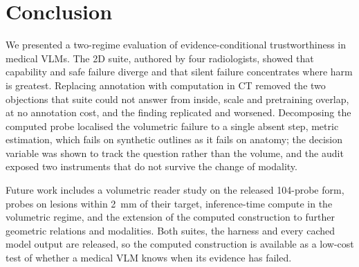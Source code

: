 \section{Conclusion}
\label{sec:conclusion}

We presented a two-regime evaluation of evidence-conditional trustworthiness
in medical VLMs. The 2D suite, authored by four radiologists, showed that
capability and safe failure diverge and that silent failure concentrates
where harm is greatest. Replacing annotation with computation in CT removed
the two objections that suite could not answer from inside, scale and
pretraining overlap, at no annotation cost, and the finding replicated and
worsened. Decomposing the computed probe localised the volumetric
failure to a single absent step, metric estimation, which fails on synthetic
outlines as it fails on anatomy; the decision variable was shown to track
the question rather than the volume, and the audit exposed two instruments
that do not survive the change of modality.

Future work includes a volumetric reader study on the released 104-probe
form, probes on lesions within 2~mm of their target, inference-time compute
in the volumetric regime, and the extension of the computed construction to
further geometric relations and modalities. Both suites,
the harness and every cached model output are released, so the computed
construction is available as a low-cost test of whether a medical VLM knows
when its evidence has failed.



